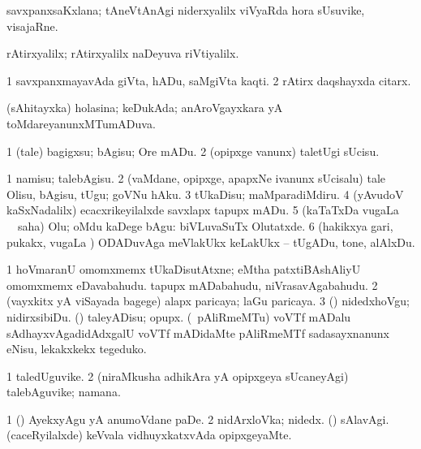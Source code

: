 \bentry
{}
\gl{\nA}
\bmng
savxpanxsaKxlana; tAneVtAnAgi niderxyalilx viVyaRda hora sUsuvike, visajaRne. 
\emng
\eentry

\bentry
{}
\gl{\kirxvi}
\bmng
rAtirxyalilx; rAtirxyalilx naDeyuva riVtiyalilx. 
\emng
\eentry

\bentry
{}
\gl{\nA}
\bmng
\bnum
\num{1} savxpanxmayavAda giVta, hADu, saMgiVta kaqti. 
\num{2} rAtirx daqshayxda citarx. 
\enum
\emng
\eentry

\bentry
{}
\gl{\gu}
\bmng
(sAhitayxka) holasina; keDukAda; anAroVgayxkara yA toMdareyanunxMTumADuva. 
\emng
\eentry

\bentry
{}
\gl{\sakirx}
\bmng
\bnum
\num{1} (tale) bagigxsu; bAgisu; Ore mADu. 
\num{2} (opipxge \mo vanunx) taletUgi sUcisu. 
\enum
\emng

\noindent
\gl{\akirx}
\bmng
\bnum
\num{1} namisu; talebAgisu. 
\num{2} (vaMdane, opipxge, apapxNe ivanunx sUcisalu) tale Olisu, bAgisu, tUgu; goVNu hAku. 
\num{3} tUkaDisu; maMparadiMdiru. 
\num{4} (yAvudoV kaSxNadalilx) ecacxrikeyilalxde savxlapx tapupx mADu. 
\num{5} (kaTaTxDa \mo vugaLa \vi\ \rUpa\ saha) Olu; oMdu kaDege bAgu:  biVLuvaSuTx Olutatxde. 
\num{6} (hakikxya gari, pukakx, \mo vugaLa \vi) ODADuvAga meVlakUkx keLakUkx -- tUgADu, tone, alAlxDu. 
\enum
\emng

\noindent
\gl{\pagu}
\bmng
\bnum
\num{1}  hoVmaranU omomxmemx tUkaDisutAtxne; eMtha patxtiBAshAliyU omomxmemx eDavabahudu. tapupx mADabahudu, niVrasavAgabahudu. 
\num{2} (vayxkitx yA viSayada bagege) alapx paricaya; laGu paricaya. 
\num{3} (\AmA) nidedxhoVgu; nidirxsibiDu. 
 (\AmA) 
\banum
{} taleyADisu; opupx. 
 (\birx\ pAliRmeMTu) voVTf mADalu sAdhayxvAgadidAdxgalU voVTf mADidaMte pAliRmeMTf sadasayxnanunx eNisu, lekakxkekx tegeduko. 
\eanum
\numie
\enum
\emng
\eentry

\bentry
{}
\gl{\nA}
\bmng
\bnum
\num{1} taledUguvike. 
\num{2} (niraMkusha adhikAra yA opipxgeya sUcaneyAgi) talebAguvike; namana. 
\enum
\emng

\noindent
\gl{\pagu}
\bmng
\bnum
\num{1}  (\ame) AyekxyAgu yA anumoVdane paDe. 
\num{2}  nidArxloVka; nidedx. 
  (\AmA) 
\banum
{} sAlavAgi. 
 (caceRyilalxde) keVvala vidhuyxkatxvAda opipxgeyaMte. 
\eanum
\numie
\enum
\emng
\eentry

